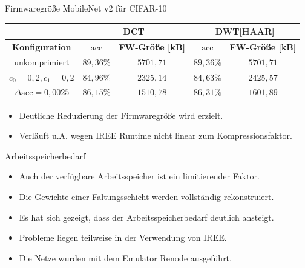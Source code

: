 \documentclass[aspectratio=169, 12pt]{beamer}
\begin{document}
\begin{frame}{Firmwaregröße MobileNet v2 für CIFAR-10}
  \begin{table}[H]
    \centering
    \begin{tabular}{|c|cc|cc|}
        \hline
                                        & \multicolumn{2}{c|}{\textbf{DCT}}                                            & \multicolumn{2}{c|}{\textbf{DWT{[}HAAR{]}}}                                  \\ \hline
        \textbf{Konfiguration}          & \multicolumn{1}{c|}{\textbf{$\text{acc}$}} & \textbf{FW-Größe {[}kB{]}} & \multicolumn{1}{c|}{\textbf{$\text{acc}$}} & \textbf{FW-Größe {[}kB{]}} \\ \hline
        unkomprimiert               & \multicolumn{1}{c|}{$89{,}36\%$}           & $5701{,}71$                     & \multicolumn{1}{c|}{$89{,}36\%$}           & $5701{,}71$                     \\ \hline
        $c_0=0{,}2, c_1=0{,}2$      & \multicolumn{1}{c|}{$84{,}96\%$}           & $2325{,}14$                     & \multicolumn{1}{c|}{$84{,}63\%$}           & $2425{,}57$                     \\ \hline
        $\Delta\text{acc}=0{,}0025$ & \multicolumn{1}{c|}{$86{,}15\%$}           & $1510{,}78$                     & \multicolumn{1}{c|}{$86{,}31\%$}           & $1601{,}89$                     \\ \hline
        \end{tabular}
\end{table}
\pause
\begin{itemize}
  \item Deutliche Reduzierung der Firmwaregröße wird erzielt.
  \item Verläuft u.A. wegen IREE Runtime nicht linear zum Kompressionsfaktor.
\end{itemize}
\end{frame}

\begin{frame}{Arbeitsspeicherbedarf}
  \begin{itemize}
    \item Auch der verfügbare Arbeitsspeicher ist ein limitierender Faktor.
    \item Die Gewichte einer Faltungsschicht werden vollständig rekonstruiert.
    \item Es hat sich gezeigt, dass der Arbeitsspeicherbedarf deutlich ansteigt.
    \item Probleme liegen teilweise in der Verwendung von IREE.
    \item Die Netze wurden mit dem Emulator Renode ausgeführt.
  \end{itemize}
\end{frame}
\end{document}
